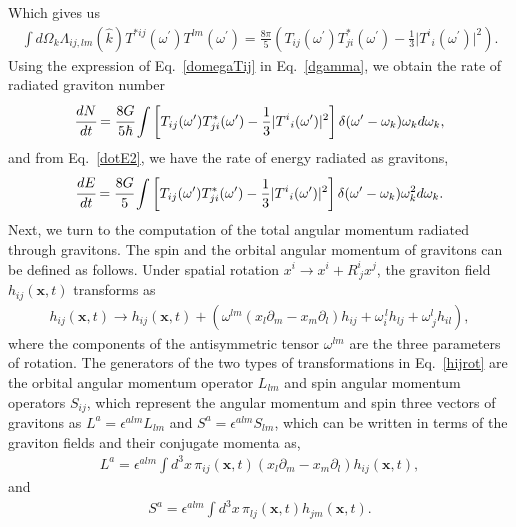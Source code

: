 \documentclass[aps,prd]{revtex4-2}
\begin{document}
Which gives us
\begin{eqnarray}
\int d\Omega_k \Lambda_{ij, lm}(\hat k) T^{*ij}(\omega^\prime) T^{lm}({\omega^\prime}) = \frac{8\pi}{5}\left(T_{ij}(\omega^\prime) T^*_{ji}(\omega^\prime)-\frac{1}{3}\Big|T^{i}{}_{i}(\omega^\prime)\Big|^2\right).
\label{domegaTij}
\end{eqnarray}
Using the expression of Eq.~\eqref{domegaTij} in Eq.~\eqref{dgamma}, we obtain the rate of radiated graviton number 
\begin{eqnarray}\label{dNdt}
\cfrac{dN}{dt}=\cfrac{8G}{5\hbar}\int \left[T_{ij}(\omega^{\prime})T^*_{ji}(\omega^{\prime})-\frac{1}{3}|T^{i}{}_{i}(\omega^{\prime})|^2\right]
\delta(\omega^{\prime}-\omega_{k})\omega_{k} d\omega_{k},
\end{eqnarray}
and from Eq.~\eqref{dotE2}, we have the rate of energy radiated as gravitons,
\begin{eqnarray}\label{dEdt}
\cfrac{dE}{dt}=\cfrac{8G}{5}\int \left[T_{ij}(\omega^{\prime})T^*_{ji}(\omega^{\prime})-\frac{1}{3}|T^{i}{}_{i}(\omega^{\prime})|^2\right]
\delta(\omega^{\prime}-\omega_{k})\omega_{k}^{2} d\omega_{k}.
\end{eqnarray}
Next, we turn to the computation of the total angular momentum radiated through gravitons. The spin and the orbital angular momentum of gravitons can be defined as follows. Under spatial rotation $x^i\rightarrow x^i +R^{i}_{{}\,j}x^j$, the graviton field $h_{ij}(\textbf{x},t)$ transforms as
\begin{eqnarray}\label{hijrot}
    h_{ij}(\textbf{x},t) \rightarrow h_{ij}(\textbf{x},t) + \left( \omega^{lm}  (x_{l} \partial_{m} -x_{m} \partial_{l}) h_{ij}  + \omega_{i}^{{}\, l}  h_{lj} + \omega_{{}\,j}^{ l}  h_{il}  \right),
\end{eqnarray}
where the components of the antisymmetric tensor $\omega^{lm}$ are the three parameters of rotation. The generators of the two types of transformations in Eq.~\eqref{hijrot} are the orbital angular momentum operator $L_{lm}$ and spin angular momentum operators $S_{ij}$, which represent the angular momentum and spin three vectors of gravitons as $L^{a}= \epsilon^{alm} L_{lm}$ and $S^{a}= \epsilon^{alm} S_{lm}$, which can be written in terms of the graviton fields and their conjugate momenta as,
\begin{eqnarray}
    L^{a}= \epsilon^{alm} \int d^3 x\,  \pi_{ij}(\textbf{x},t) \left(  x_{l} \partial_{m} -x_{m} \partial_{l}\right)h_{ij}(\textbf{x},t),
\end{eqnarray}
and
\begin{eqnarray}
    S^a= \epsilon^{alm} \int d^3 x \, \pi_{lj}(\textbf{x},t)
h_{jm}(\textbf{x},t).
\end{eqnarray}
\end{document}
